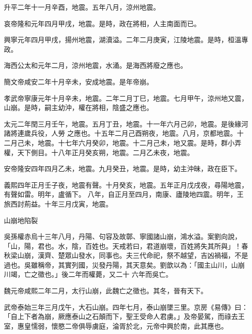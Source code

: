 \begin{pinyinscope}
 升平二年十一月辛酉，地震。五年八月，涼州地震。



 哀帝隆和元年四月甲戌，地震。是時，政在將相，人主南面而已。



 興寧元年四月甲戌，揚州地震，湖瀆溢。二年二月庚寅，江陵地震。是時，桓溫專政。



 海西公太和元年二月，涼州地震，水涌。是海西將廢之應也。



 簡文帝咸安二年十月辛未，安成地震。是年帝崩。



 孝武帝寧康元年十月辛未，地震。二年二月丁巳，地震。七月甲午，涼州地又震，山崩。是時，嗣主幼沖，權在將相，陰盛之應也。



 太元二年閏三月壬午，地震。五月丁丑，地震。十一年六月己卯，地震。是後緣河諸將連歲兵役，人勞
 之應也。十五年二月己酉朔夜，地震。八月，京都地震。十二月己未，地震。十七年六月癸卯，地震。十二月己未，地又震。是時，群小弄權，天下側目。十八年正月癸亥朔，地震。二月乙未夜，地震。



 安帝隆安四年四月乙未，地震。九月癸丑，地震。是時，幼主沖昧，政在臣下。



 義熙四年正月壬子夜，地震有聲。十月癸亥，地震。五年正月戊戌夜，尋陽地震，有聲如雷。明年，盧循下。
 八年，自正月至四月，南康、廬陵地四震。明年，王旅西討荊益。十年三月戊寅，地震。



 山崩地陷裂



 吳孫權赤烏十三年八月，丹陽、句容及故鄣、寧國諸山崩，鴻水溢。案劉向說，「山，陽，君也。水，陰，百姓也。天戒若曰，君道崩壞，百姓將失其所與」！春秋梁山崩，漢齊、楚眾山發水，同事也。夫三代命祀，祭不越望，吉凶禍福，不是過也。吳雖稱帝，其實列國，災發丹陽，其天意矣。劉歆以為：「國主山川，山崩川竭，亡之徵也。」後二年而權薨，又二十
 六年而吳亡。



 魏元帝咸熙二年二月，太行山崩，此魏亡之徵也。其冬，晉有天下。



 武帝泰始三年三月戊午，大石山崩。四年七月，泰山崩墜三里。京房《易傳》曰：「自上下者為崩，厥應泰山之石顛而下，聖王受命人君虜。」及帝晏駕，而祿去王室，惠皇懦弱，懷愍二帝俱辱虜庭，淪胥於北，元帝中興於南，此其應也。




\end{pinyinscope}
